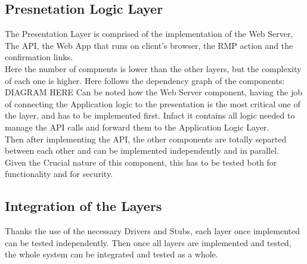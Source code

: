 \subsection{Presnetation Logic Layer}
The Presentation Layer is comprised of the implementation of the Web Server, The API, the Web App that runs on client's browser, the RMP action and the confirmation links.\\
Here the number of compnents is lower than the other layers, but the complexity of each one is higher. Here follows the dependency graph of the components:
DIAGRAM HERE
Can be noted how the Web Server component, having the job of connecting the Application logic to the presentation is the most critical one of the layer, and has to be implemented first. Infact it contains all logic needed to manage the API calls and forward them to the Application Logic Layer.\\
Then after implementing the API, the other components are totally separted between each other and can be implemented independently and in parallel.\\   
Given the Crucial nature of this component, this has to be tested both for functionality and for security. \\

\subsection{Integration of the Layers}
Thanks the use of the necessary Drivers and Stubs, each layer once implemented can be tested independently. Then once all layers are implemented and tested, the whole system can be integrated and tested as a whole.\\